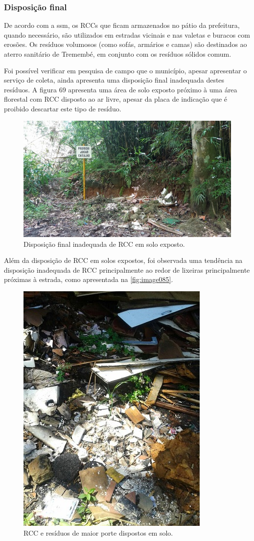 	
	\subsubsection{Disposição final}
	De acordo com a \gls{ssm}, os RCCs que ficam armazenados no pátio da prefeitura, quando necessário, são utilizados em estradas vicinais e nas valetas e buracos com erosões. Os resíduos volumosos (como sofás, armários e camas) são destinados ao aterro sanitário de Tremembé, em conjunto com os resíduos sólidos comum.
	
	Foi possível verificar em pesquisa de campo que o município, apesar apresentar o serviço de coleta, ainda apresenta uma disposição final inadequada destes resíduos. A figura 69 apresenta uma área de solo exposto próximo à uma área florestal com RCC disposto ao ar livre, apesar da placa de indicação que é proibido descartar este tipo de resíduo.
	
	\begin{figure}
		\centering
		\includegraphics[width=0.7\linewidth]{produtos/prodtres/image084}
		\caption{Disposição final inadequada de RCC em solo exposto.}
		\label{fig:image084}
	\end{figure}
	
	
	Além da disposição de RCC em solos expostos, foi observada uma tendência na disposição inadequada de RCC principalmente ao redor de lixeiras principalmente próximas à estrada, como apresentada na \autoref{fig:image085}.

\clearpage	
	\begin{figure}
		\centering
		\includegraphics[width=0.4\linewidth]{produtos/prodtres/image085}
		\caption{RCC e resíduos de maior porte dispostos em solo.}
		\label{fig:image085}
	\end{figure}

